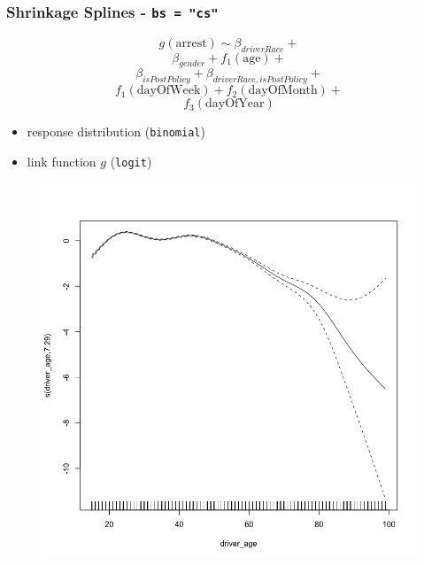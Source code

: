\documentclass{beamer}
\begin{document}
\begin{frame}
\frametitle{Shrinkage Splines - \texttt{bs = "cs"}}


\begin{multicols}{2}
$$g(\text{arrest}) \sim \beta_{driverRace} + $$
$$ \beta_{gender} + f_1(\text{age}) +$$
$$\beta_{isPostPolicy}+ \beta_{driverRace, isPostPolicy}+$$
$$ f_1(\text{dayOfWeek}) + f_2(\text{dayOfMonth})+ $$
$$ f_3(\text{dayOfYear})$$


\begin{itemize}
\item response distribution (\texttt{binomial}) 
\item link function $g$ (\texttt{logit})
\end{itemize}

\columnbreak

\begin{figure}
\includegraphics[scale=.2]{figures/smoothAge}
\end{figure}

\end{multicols}

\end{frame}
\end{document}
